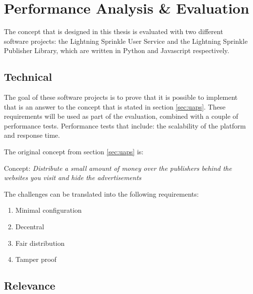 \chapter{Performance Analysis \& Evaluation}
\label{cha:evaluation}

The concept that is designed in this thesis is evaluated with two different software projects: the Lightning Sprinkle User Service and the Lightning Sprinkle Publisher Library, which are written in Python and Javascript respectively. 

\section{Technical}

The goal of these software projects is to prove that it is possible to implement that is an answer to the concept that is stated in section \ref{sec:uaps}. These requirements will be used as part of the evaluation, combined with a couple of performance tests. Performance tests that include: the scalability of the platform and response time. 

\noindent The original concept from section \ref{sec:uaps} is:

\vspace{1em}

Concept: \textit{Distribute a small amount of money over the publishers behind the websites you visit and hide the advertisements}

\vspace{1em}

\noindent The challenges can be translated into the following requirements:
\begin{enumerate}
  \item Minimal configuration
  \item Decentral
  \item Fair distribution
  \item Tamper proof
\end{enumerate}

\section{Relevance}